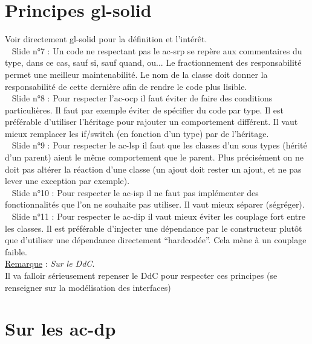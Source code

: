 \documentclass[a4paper,12pt,twoside]{article}
\newcommand{\incode}[1]{{\footnotesize\ttfamily #1}} %
\newcommand{\rem}[2]{\noindent\underline{Remarque} : \textit{#1}.\\ \indent #2}
\newcommand{\slide}[2]{\textbullet ~ Slide n°#1 : \indent #2}
\begin{document}
\section{Principes \gls{gl-solid}}
Voir directement \gls{gl-solid} pour la définition et l'intérêt.\\

\slide{7}{Un code ne respectant pas le \gls{ac-srp} se repère aux commentaires du type, dans ce cas, sauf si, sauf quand, ou... Le fractionnement des responsabilité permet une meilleur maintenabilité. Le nom de la classe doit donner la responsabilité de cette dernière afin de rendre le code plus lisible.
}\\ 

\slide{8}{Pour respecter l'\gls{ac-ocp} il faut éviter de faire des conditions particulières. Il faut par exemple éviter de spécifier du code par type. Il est préférable d'utiliser l'héritage pour rajouter un comportement différent. Il vaut mieux remplacer les \incode{if}/\incode{switch} (en fonction d'un type) par de l'héritage.
}\\ 

\slide{9}{Pour respecter le \gls{ac-lsp} il faut que les classes d'un sous types (hérité d'un parent) aient le même comportement que le parent. Plus précisément on ne doit pas altérer la réaction d'une classe (un ajout doit rester un ajout, et ne pas lever une exception par exemple).
}\\

\slide{10}{Pour respecter le \gls{ac-isp} il ne faut pas implémenter des fonctionnalités que l'on ne souhaite pas utiliser. Il vaut mieux séparer (ségréger).
}\\

\slide{11}{Pour respecter le \gls{ac-dip} il vaut mieux éviter les couplage fort entre les classes. Il est préférable d'injecter une dépendance par le constructeur plutôt que d'utiliser une dépendance directement ``hardcodée''. Cela mène à un couplage faible. 
} \\

\rem{Sur le DdC}{Il va falloir sérieusement repenser le DdC pour respecter ces principes (se renseigner sur la modélisation des interfaces)}

\section{Sur les \gls{ac-dp}}
\end{document}
